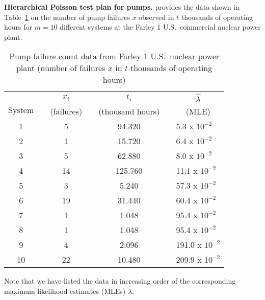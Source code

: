 \documentclass {book}
\begin{document}
\begin{sidebar}\label{ch10:ex4}
{\bf Hierarchical Poisson test plan for pumps.} \citet{GO87}
provides the data shown in Table~\ref{ch10:tab3} on the number of
pump failures $x$ observed in $t$ thousands of operating hours for
$m = 10$ different systems at the Farley 1 U.S.\ commercial
nuclear power plant.

\begin{table}
\caption{Pump failure count data from Farley 1 U.S.\ nuclear power
plant (number of failures $x$ in $t$ thousands of operating hours)
\citep{GO87}}\label{ch10:tab3}
 \centering
\begin{tabular}{cccccll}
\hline
\mbox{} & \mbox{} & \multicolumn{1}{c}{$x_{i}$} & \mbox{} & \multicolumn{1}{c}{$t_{i}$} & \mbox{} & \multicolumn{1}{c}{$\widehat{\lambda}$}\\
$\mbox{System}$ & \mbox{} & \multicolumn{1}{c}{(failures)} & \mbox{} & \multicolumn{1}{c}{(thousand hours)} & \mbox{} & \multicolumn{1}{c}{(MLE)}\\
\hline%
1  & \mbox{} & \hspace{0.05in}5  & \mbox{} & \hspace{0.05in}94.320  & \mbox{} & 5.3 x $10^{-2}$\\
2  & \mbox{} & \hspace{0.05in}1  & \mbox{} & \hspace{0.05in}15.720  & \mbox{} & 6.4 x $10^{-2}$\\
3  & \mbox{} & \hspace{0.05in}5  & \mbox{} & \hspace{0.05in}62.880  & \mbox{} & 8.0 x $10^{-2}$\\
4  & \mbox{} & 14 & \mbox{} & 125.760 & \mbox{} & 11.1 x $10^{-2}$\\
5  & \mbox{} & \hspace{0.05in}3  & \mbox{} & \hspace{0.11in}5.240   & \mbox{} & 57.3 x $10^{-2}$\\
6  & \mbox{} & 19 & \mbox{} & \hspace{0.05in}31.440  & \mbox{} & 60.4 x $10^{-2}$\\
7  & \mbox{} &\hspace{0.05in}1   & \mbox{} & \hspace{0.11in}1.048   & \mbox{} & 95.4 x $10^{-2}$\\
8  & \mbox{} & \hspace{0.05in}1  & \mbox{} & \hspace{0.11in}1.048   & \mbox{} & 95.4 x $10^{-2}$\\
9  & \mbox{} & \hspace{0.05in}4  & \mbox{} & \hspace{0.11in}2.096   & \mbox{} & 191.0 x $10^{-2}$\\
10 & \mbox{} & 22 & \mbox{} & \hspace{0.05in}10.480  & \mbox{} & 209.9 x $10^{-2}$\\
\hline
\end{tabular}
\end{table}
Note that we have listed the data in increasing order of the
corresponding maximum likelihood estimates (MLEs)
$\widehat{\lambda}$.


\end{sidebar}
\end{document}
